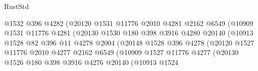 \begin{lexlean}{RustStd}
\begin{coremodule}
                                    @1532
                                    @396
                                    @4282
                                    (@20120
                                      @1531
                                      @11776
                                      @2010
                                      @4281
                                      @2162
                                      @6549
                                      (@10909
                                        @1531
                                        @11776
                                        @4281
                                        (@20130
                                          @1530
                                          @180
                                          @398
                                          @3916
                                          @4280
                                          @20140
                                          (@10913
                                            @1528
                                            @82
                                            @396
                                            @11
                                            @4278
                                            @2004
                                            (@20148
                                              @1528
                                              @396
                                              @4278
                                              (@20120
                                                @1527
                                                @11776
                                                @2010
                                                @4277
                                                @2162
                                                @6549
                                                (@10909
                                                  @1527
                                                  @11776
                                                  @4277
                                                  (@20130
                                                    @1526
                                                    @180
                                                    @398
                                                    @3916
                                                    @4276
                                                    @20140
                                                    (@10913
                                                      @1524

\end{coremodule}
\end{lexlean}
